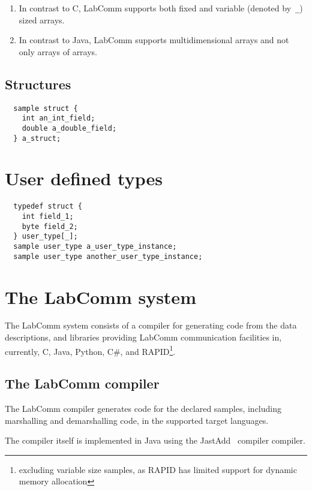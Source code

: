 \documentclass[a4paper]{article}
\begin{document}
\begin{enumerate}
\item In contrast to C, LabComm supports both fixed and variable (denoted
by~\verb+_+) sized arrays.

\item In contrast to Java, LabComm supports multidimensional arrays and not
only arrays of arrays.

\end{enumerate}

\subsection{Structures}

\begin{verbatim}
  sample struct {
    int an_int_field;
    double a_double_field;
  } a_struct;
\end{verbatim}

\section{User defined types}

\begin{verbatim}
  typedef struct {
    int field_1;
    byte field_2;
  } user_type[_];
  sample user_type a_user_type_instance;
  sample user_type another_user_type_instance;
\end{verbatim}

\section{The LabComm system}

The LabComm system consists of a compiler for generating code from the data
descriptions, and libraries providing LabComm communication facilities in,
currently, C, Java, Python, C\#, and RAPID\footnote{excluding variable
size samples, as RAPID has limited support for dynamic memory allocation}.


\subsection{The LabComm compiler}

The LabComm compiler generates code for the declared samples, including marshalling and
demarshalling code, in the supported target languages.

The compiler itself is implemented in Java using the JastAdd~\cite{jastadd} compiler compiler.
\end{document}
